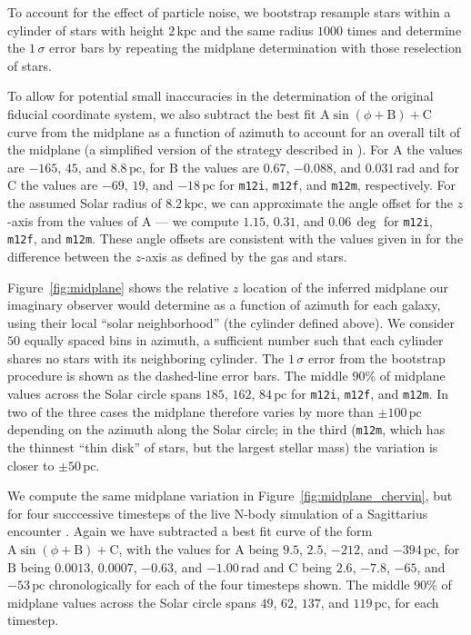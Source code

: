 \documentclass[twocolumn]{aastex62}
\newcommand{\pc}{\text{pc}}
\newcommand{\kpc}{\text{kpc}}
\newcommand{\mi}{\texttt{m12i}}
\newcommand{\mf}{\texttt{m12f}}
\newcommand{\mm}{\texttt{m12m}}
\begin{document}
To account for the effect of particle noise, we bootstrap resample stars
within a cylinder of stars with height $2\,\kpc$ and the same radius $1000$
times and determine the $1\,\sigma$ error bars by repeating the midplane
determination with those reselection of stars.

To allow for potential small inaccuracies in the determination of the original
fiducial coordinate system, we also subtract the best fit $\text{A}
\sin{\left(\phi + \text{B}\right)} + \text{C}$ curve from the midplane as a
function of azimuth to account for an overall tilt of the midplane (a
simplified version of the strategy described in
\citealt{2019ApJ...871..145A}). For $\text{A}$ the values are $-165$, $45$,
and $8.8\,\pc$, for $\text{B}$ the values are $0.67$, $-0.088$, and
$0.031\,\text{rad}$ and for $\text{C}$ the values are $-69$, $19$, and
$-18\,\pc$ for \mi{}, \mf{}, and \mm{}, respectively. For the assumed Solar
radius of $8.2\,\kpc$, we can approximate the angle offset for the $z$-axis
from the values of $\text{A}$ --- we compute $1.15$, $0.31$, and $0.06\,\deg$
for \mi{}, \mf{}, and \mm{}. These angle offsets are consistent with the
values given in \citet{2018arXiv180610564S} for the difference between the
$z$-axis as defined by the gas and stars.

Figure~\ref{fig:midplane} shows the relative $z$ location of the inferred
midplane our imaginary observer would determine as a function of azimuth for
each galaxy, using their local ``solar neighborhood'' (the cylinder defined
above). We consider $50$ equally spaced bins in azimuth, a sufficient number
such that each cylinder shares no stars with its neighboring cylinder. The
$1\,\sigma$ error from the bootstrap procedure is shown as the dashed-line
error bars. The middle $90\%$ of midplane values across the Solar circle spans
$185$, $162$, $84\,\pc$ for \mi{}, \mf{}, and \mm{}. In two of the three cases
the midplane therefore varies by more than $\pm 100\,\pc$ depending on the
azimuth along the Solar circle; in the third (\mm{}, which has the thinnest
``thin disk'' of stars, but the largest stellar mass) the variation is closer
to $\pm 50\,\pc$.

We compute the same midplane variation in Figure~\ref{fig:midplane_chervin},
but for four succcessive timesteps of the live N-body simulation of a
Sagittarius encounter \citep{2018MNRAS.481..286L}. Again we have subtracted a
best fit curve of the form $\text{A} \sin{\left(\phi + \text{B}\right)} +
\text{C}$, with the values for $\text{A}$ being $9.5$, $2.5$, $-212$, and
$-394\,\pc$, for $\text{B}$ being $0.0013$, $0.0007$, $-0.63$, and
$-1.00\,\text{rad}$ and $\text{C}$ being $2.6$, $-7.8$, $-65$, and $-53\,\pc$
chronologically for each of the four timesteps shown. The middle $90\%$ of midplane values across the Solar circle spans $49$, $62$, $137$, and $119\,\pc$, for each timestep.
\end{document}
